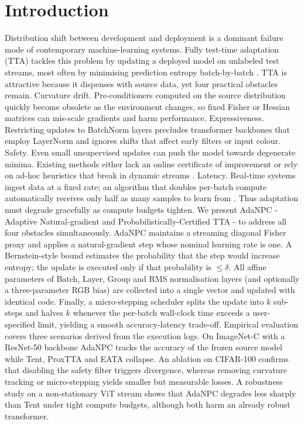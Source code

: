 \documentclass{article} %
\begin{document}
\section{Introduction}
\label{sec:intro}
Distribution shift between development and deployment is a dominant failure mode of contemporary machine-learning systems. Fully test-time adaptation (TTA) tackles this problem by updating a deployed model on unlabeled test streams, most often by minimising prediction entropy batch-by-batch \cite{wang-2020-tent}. TTA is attractive because it dispenses with source data, yet four practical obstacles remain.
Curvature drift. Pre-conditioners computed on the source distribution quickly become obsolete as the environment changes, so fixed Fisher or Hessian matrices can mis-scale gradients and harm performance.
Expressiveness. Restricting updates to BatchNorm layers precludes transformer backbones that employ LayerNorm and ignores shifts that affect early filters or input colour.
Safety. Even small unsupervised updates can push the model towards degenerate minima. Existing methods either lack an online certificate of improvement or rely on ad-hoc heuristics that break in dynamic streams \cite{niu-2023-towards,hoang-2023-persistent}.
Latency. Real-time systems ingest data at a fixed rate; an algorithm that doubles per-batch compute automatically receives only half as many samples to learn from \cite{alfarra-2023-evaluation}. Thus adaptation must degrade gracefully as compute budgets tighten.
We present AdaNPC - Adaptive Natural-gradient and Probabilistically-Certified TTA - to address all four obstacles simultaneously. AdaNPC maintains a streaming diagonal Fisher proxy and applies a natural-gradient step whose nominal learning rate is one. A Bernstein-style bound estimates the probability that the step would increase entropy; the update is executed only if that probability is \(\leq \delta\). All affine parameters of Batch, Layer, Group and RMS normalisation layers (and optionally a three-parameter RGB bias) are collected into a single vector and updated with identical code. Finally, a micro-stepping scheduler splits the update into \(k\) sub-steps and halves \(k\) whenever the per-batch wall-clock time exceeds a user-specified limit, yielding a smooth accuracy-latency trade-off.
Empirical evaluation covers three scenarios derived from the execution logs. On ImageNet-C with a ResNet-50 backbone AdaNPC tracks the accuracy of the frozen source model while Tent, ProxTTA and EATA collapse. An ablation on CIFAR-100 confirms that disabling the safety filter triggers divergence, whereas removing curvature tracking or micro-stepping yields smaller but measurable losses. A robustness study on a non-stationary ViT stream shows that AdaNPC degrades less sharply than Tent under tight compute budgets, although both harm an already robust transformer.
\end{document}

